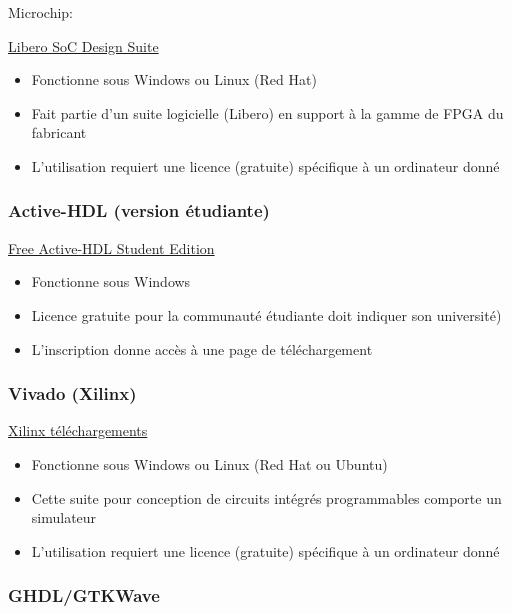 \documentclass[11pt]{article}
\begin{document}
Microchip:

\href{https://www.microchip.com/en-us/products/fpgas-and-plds/fpga-and-soc-design-tools/fpga/libero-software-later-versions\#downloads}{Libero SoC Design Suite}

\begin{itemize}
\item Fonctionne sous Windows ou Linux (Red Hat)
\item Fait partie d'un suite logicielle (Libero) en support à la gamme de
FPGA du fabricant
\item L'utilisation requiert une licence (gratuite) spécifique à un
ordinateur donné
\end{itemize}

\subsubsection{Active-HDL (version étudiante)}
\label{sec:orge35871b}

\href{https://www.aldec.com/en/products/fpga\_simulation/active\_hdl\_student}{Free Active-HDL Student Edition}

\begin{itemize}
\item Fonctionne sous Windows
\item Licence gratuite pour la communauté étudiante doit indiquer son université)
\item L'inscription donne accès à une page de téléchargement
\end{itemize}

\subsubsection{Vivado (Xilinx)}
\label{sec:org349e7f2}

\href{https://www.xilinx.com/support/download.html}{Xilinx téléchargements}

\begin{itemize}
\item Fonctionne sous Windows ou Linux (Red Hat ou Ubuntu)
\item Cette suite pour conception de circuits intégrés programmables
comporte un simulateur
\item L'utilisation requiert une licence (gratuite) spécifique à un
ordinateur donné
\end{itemize}

\subsubsection{GHDL/GTKWave}
\label{sec:org0214bdd}
\end{document}
